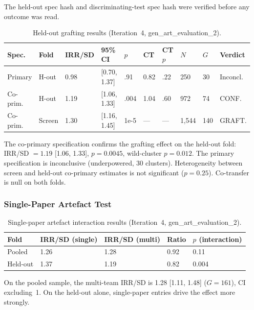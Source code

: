 \documentclass[11pt,letterpaper]{article}
\begin{document}
The held-out spec hash and discriminating-test spec hash were verified before any outcome was read.

\begin{table}[!htbp]
\centering
\caption{Held-out grafting results (Iteration~4, gen\_art\_evaluation\_2).}
\label{tab:heldout_grafting}
{\scriptsize\setlength{\tabcolsep}{3pt}
\begin{tabular}{L{1.5cm}L{1cm}R{1cm}L{1.5cm}R{0.5cm}R{0.5cm}R{0.5cm}R{0.7cm}R{0.4cm}L{1cm}}
\toprule
Spec. & Fold & IRR/SD & 95\% CI & $p$ & CT & CT $p$ & $N$ & $G$ & Verdict \\
\midrule
Primary & H-out & 0.98 & [0.70, 1.37] & .91 & 0.82 & .22 & 250 & 30 & Inconcl. \\
Co-prim. & H-out & 1.19 & [1.06, 1.33] & .004 & 1.04 & .60 & 972 & 74 & CONF. \\
Co-prim. & Screen & 1.30 & [1.16, 1.45] & 1e-5 & --- & --- & 1,544 & 140 & GRAFT. \\
\bottomrule
\end{tabular}
}
\end{table}

The co-primary specification confirms the grafting effect on the held-out fold: IRR/SD $= 1.19$ [1.06, 1.33], $p = 0.0045$, wild-cluster $p = 0.012$. The primary specification is inconclusive (underpowered, 30 clusters). Heterogeneity between screen and held-out co-primary estimates is not significant ($p = 0.25$). Co-transfer is null on both folds.

\subsubsection{Single-Paper Artefact Test}

\begin{table}[!htbp]
\centering
\caption{Single-paper artefact interaction results (Iteration~4, gen\_art\_evaluation\_2).}
\label{tab:single_paper}
\begin{tabular}{lR{2cm}R{2cm}R{2cm}R{2cm}}
\toprule
Fold & IRR/SD (single) & IRR/SD (multi) & Ratio & $p$ (interaction) \\
\midrule
Pooled & 1.26 & 1.28 & 0.92 & 0.11 \\
Held-out & 1.37 & 1.19 & 0.82 & 0.004 \\
\bottomrule
\end{tabular}
\end{table}

On the pooled sample, the multi-team IRR/SD is 1.28 [1.11, 1.48] ($G = 161$), CI excluding~1. On the held-out alone, single-paper entries drive the effect more strongly.
\end{document}
